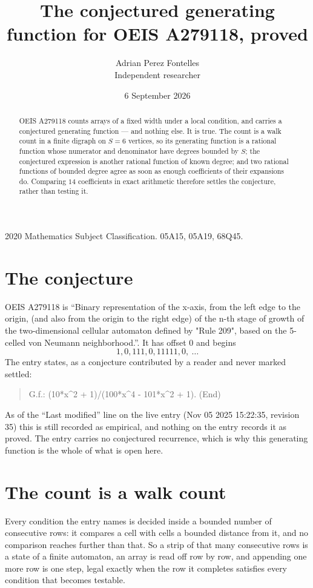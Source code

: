 \documentclass[11pt,a4paper]{article}
\title{The conjectured generating function for OEIS A279118, proved}
\author{Adrian Perez Fontelles\\ \small Independent researcher}
\date{6 September 2026}
\theoremstyle{plain}
\theoremstyle{definition}
\begin{document}
\maketitle

\begin{abstract}
OEIS A279118 counts arrays of a fixed width under a local condition, and carries a conjectured
generating function --- and nothing else. It is true. The count is a walk count in a finite
digraph on $S=6$ vertices, so its generating function is a rational function whose numerator
and denominator have degrees bounded by $S$; the conjectured expression is another rational
function of known degree; and two rational functions of bounded degree agree as soon as enough
coefficients of their expansions do. Comparing $14$ coefficients in exact arithmetic
therefore settles the conjecture, rather than testing it.
\end{abstract}

\noindent\small 2020 Mathematics Subject Classification. 05A15, 05A19, 68Q45.\normalsize

\section{The conjecture}

OEIS A279118 is ``Binary representation of the x-axis, from the left edge to the origin, (and also from the origin to the right edge) of the n-th stage of growth of the two-dimensional cellular automaton defined by "Rule 209", based on the 5-celled von Neumann neighborhood.''. It has offset $0$ and begins
\[
1, 0, 111, 0, 11111, 0,\ \dots
\]
The entry states, as a conjecture contributed by a reader and never marked settled:
\begin{quote}
G.f.: (10*x\^{}2 + 1)/(100*x\^{}4 - 101*x\^{}2 + 1). (End)
\end{quote}
As of the ``Last modified'' line on the live entry (Nov 05 2025 15:22:35, revision 35) this is still
recorded as empirical, and nothing on the entry records it as proved. The entry carries no
conjectured recurrence, which is why this generating function is the whole of what is open
here.

\section{The count is a walk count}

Every condition the entry names is decided inside a bounded number of consecutive rows: it
compares a cell with cells a bounded distance from it, and no comparison reaches further than
that. So a strip of that many consecutive rows is a state of a finite automaton, an array is
read off row by row, and appending one more row is one step, legal exactly when the row it
completes satisfies every condition that becomes testable.
\end{document}
